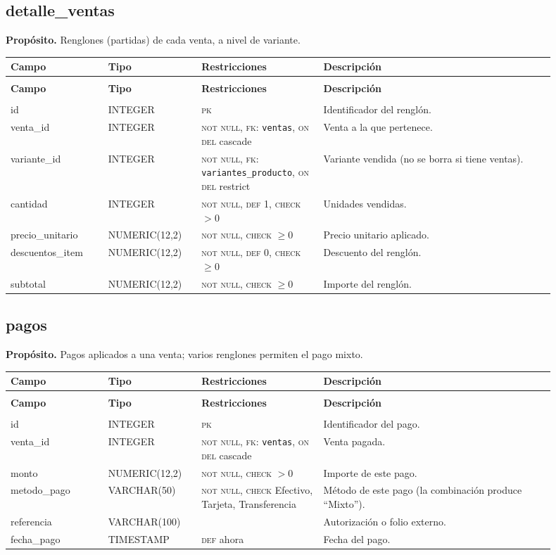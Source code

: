 \documentclass[11pt]{article}
\makeatletter
\newenvironment{campos}{%
  \par\footnotesize
  \setlength{\LTpre}{0.3ex}\setlength{\LTpost}{0.6ex}
  \begin{longtable}{@{}>{\ttfamily}p{0.165\linewidth} >{\ttfamily}p{0.150\linewidth} p{0.205\linewidth} >{\raggedright\arraybackslash}p{0.385\linewidth}@{}}
  \toprule
  \normalfont\bfseries Campo & \normalfont\bfseries Tipo & \normalfont\bfseries Restricciones & \normalfont\bfseries Descripción \\
  \midrule \endfirsthead
  \multicolumn{4}{@{}l}{\footnotesize\itshape \dots\ continuación}\\[0.3ex]
  \toprule
  \normalfont\bfseries Campo & \normalfont\bfseries Tipo & \normalfont\bfseries Restricciones & \normalfont\bfseries Descripción \\
  \midrule \endhead
  \midrule \multicolumn{4}{r@{}}{\footnotesize\itshape continúa en la siguiente página}\\ \endfoot
  \bottomrule \endlastfoot
}{%
  \end{longtable}\par
}
\newcommand{\proposito}[1]{\par\vspace{0.2ex}\noindent\colorbox{brandlight}{\parbox{\dimexpr\linewidth-2\fboxsep}{\small\textbf{Propósito.} #1}}\par\vspace{0.8ex}}
\newcommand{\pk}{\textsc{pk}}
\newcommand{\fk}[1]{\textsc{fk}: \texttt{#1}}
\newcommand{\nn}{\textsc{not null}}
\makeatother
\begin{document}
\subsection{detalle\_ventas}
\proposito{Renglones (partidas) de cada venta, a nivel de variante.}
\begin{campos}
id              & INTEGER       & \pk{}   & Identificador del renglón. \\
venta\_id       & INTEGER       & \nn, \fk{ventas}, \textsc{on del} cascade & Venta a la que pertenece. \\
variante\_id    & INTEGER       & \nn, \fk{variantes\_producto}, \textsc{on del} restrict & Variante vendida (no se borra si tiene ventas). \\
cantidad        & INTEGER       & \nn, \textsc{def} 1, \textsc{check} $>0$ & Unidades vendidas. \\
precio\_unitario & NUMERIC(12,2) & \nn, \textsc{check} $\geq 0$ & Precio unitario aplicado. \\
descuentos\_item & NUMERIC(12,2) & \nn, \textsc{def} 0, \textsc{check} $\geq 0$ & Descuento del renglón. \\
subtotal        & NUMERIC(12,2) & \nn, \textsc{check} $\geq 0$ & Importe del renglón. \\
\end{campos}

\subsection{pagos}
\proposito{Pagos aplicados a una venta; varios renglones permiten el pago mixto.}
\begin{campos}
id          & INTEGER       & \pk{}   & Identificador del pago. \\
venta\_id   & INTEGER       & \nn, \fk{ventas}, \textsc{on del} cascade & Venta pagada. \\
monto       & NUMERIC(12,2) & \nn, \textsc{check} $>0$ & Importe de este pago. \\
metodo\_pago & VARCHAR(50)  & \nn, \textsc{check} Efectivo, Tarjeta, Transferencia & Método de este pago (la combinación produce ``Mixto''). \\
referencia  & VARCHAR(100)  &         & Autorización o folio externo. \\
fecha\_pago & TIMESTAMP     & \textsc{def} ahora & Fecha del pago. \\
\end{campos}
\end{document}
